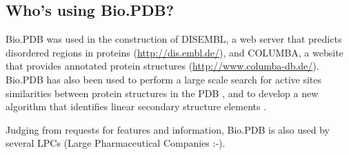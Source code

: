 \subsection{Who's using Bio.PDB?}

Bio.PDB was used in the construction of DISEMBL, a web server that
predicts disordered regions in proteins (\url{http://dis.embl.de/}),
and COLUMBA, a website that provides annotated protein structures
(\url{http://www.columba-db.de/}). Bio.PDB has also been used to
perform a large scale search for active sites similarities between
protein structures in the PDB \cite[Hamelryck, 2003]{hamelryck2003b}, and to develop a new algorithm
that identifies linear secondary structure elements \cite[Majumdar \textit{et al.}, 2005]{majumdar2005}.

Judging from requests for features and information, Bio.PDB is also
used by several LPCs (Large Pharmaceutical Companies :-).

